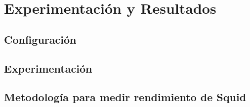 \chapter{Experimentación y Resultados}

\section{Configuración}
\section{Experimentación}\label{cap:Tests}
\section{Metodología para medir rendimiento de Squid}\label{cap:Met}

\begin{figure}
\end{figure}



